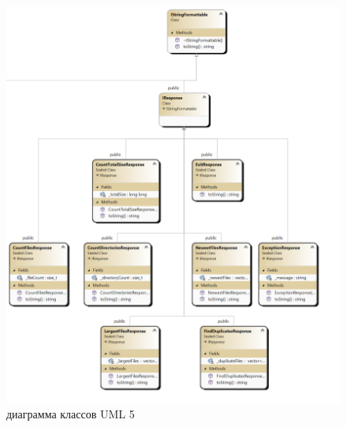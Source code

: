 \begin{figure}[ht] 
	\center
	\includegraphics [scale=0.6] {my_folder/images/uml7.png}
	\caption{диаграмма классов UML 5} 
	\label{fig:uml5}  
\end{figure}\newpage

